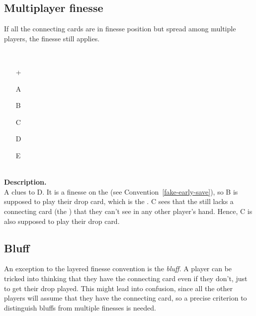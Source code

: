 \subsection{Multiplayer finesse}

\begin{convention}
	\label{multiplayer-finesse}
	If all the connecting cards are in finesse position but spread among multiple players, the finesse still applies.
\end{convention}

\begin{example} \hfill \\
	\begin{minipage}{0.45\textwidth}
		\begin{itemize}
			\item[\Large +]      
			\item[\Large A]    
			\item[\Large B]    
			\item[\Large C]    
			\item[\Large D]    
			\item[\Large E]    
		\end{itemize}
	\end{minipage}%
	\begin{minipage}{0.55\textwidth}
		\hfill \\
		
		\textbf{Description.} \\
		
		A clues  to D. It is a finesse on the  (see Convention~\ref{fake-early-save}), so B is supposed to play their drop card, which is the . C sees that the  still lacks a connecting card (the ) that they can't see in any other player's hand. Hence, C is also supposed to play their drop card.
	\end{minipage}
\end{example} \vspace{0.15 cm}

\subsection{Bluff}

An exception to the layered finesse convention is the \emph{bluff}. A player can be tricked into thinking that they have the connecting card even if they don't, just to get their drop played. This might lead into confusion, since all the other players will assume that they have the connecting card, so a precise criterion to distinguish bluffs from multiple finesses is needed.

